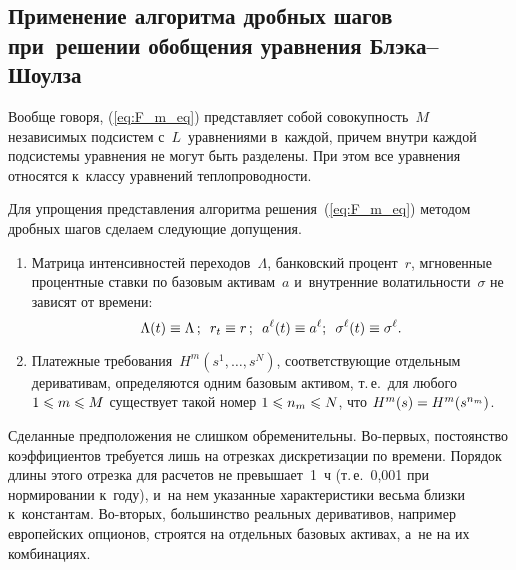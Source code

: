 \begin{multicols}{2}
\section{Применение алгоритма дробных шагов при~решении обобщения уравнения Блэка--Шоулза}

Вообще говоря, (\ref{eq:F_m_eq}) пред\-став\-ля\-ет собой со\-во\-куп\-ность~$M$ независимых под\-сис\-тем с~$L$~уравнениями в~каж\-дой, 
причем внут\-ри каждой  под\-сис\-те\-мы уравнения не могут быть разделены. При этом все урав\-не\-ния относятся к~классу урав\-не\-ний теп\-ло\-про\-вод\-ности.

Для упрощения пред\-став\-ле\-ния алгоритма решения~(\ref{eq:F_m_eq}) методом дроб\-ных шагов сделаем сле\-ду\-ющие до\-пу\-щения.
\begin{enumerate}
\item
Матрица интенсивностей переходов~$\Lambda$,
банковский процент~$r$, мгновенные процентные став\-ки по базовым активам~$a$ и~внут\-рен\-ние волатильности~$\sigma$ не зависят от времени:
$$
\Lambda(t) \equiv \Lambda\,;\enskip r_t \equiv r\,;\enskip a^{\ell}(t) \equiv a^{\ell};\enskip \sigma^{\ell}(t) \equiv  \sigma^{\ell}.
$$
\item
Платежные требования~$H^m(s^1,\ldots,s^N)$, со\-от\-вет\-ст\-ву\-ющие отдельным деривативам, определяются одним базовым активом, т.\,е.\
 для любого $1 \hm\leqslant m \hm \leqslant M$ существует такой номер $1 \hm\leqslant n_m \hm\leqslant N$, что $H^m(s)\hm = H^{m}(s^{n_m})$.
\end{enumerate}
Сделанные предположения не слишком обременительны. Во-пер\-вых, постоянство коэффициентов требуется лишь на отрезках дискретизации по времени. 
Порядок длины этого отрезка для расчетов не превышает~1~ч (т.\,е.~0,001 при нормировании к~году), 
и~на нем указанные характеристики весьма близ\-ки к~константам. Во-вто\-рых, большинство реальных деривативов, например европейских опционов, 
строятся на отдельных базовых активах, а~не на их комбинациях.


\end{multicols}
